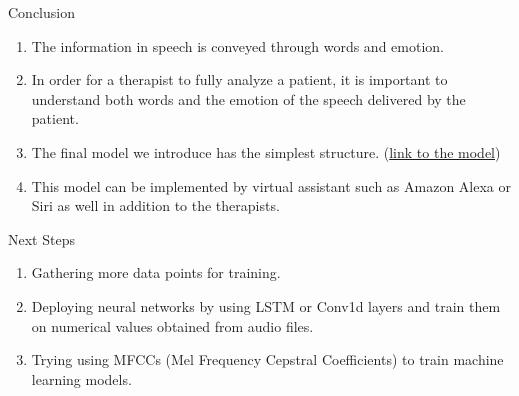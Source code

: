 \documentclass[xcolor={table}]{beamer}
\begin{document}
\begin{frame}{Conclusion}

\begin{enumerate}
    \item The information in speech is conveyed through words and emotion. 
    \item In order for a therapist to fully analyze a patient, it is important to understand both words and the emotion of the speech delivered by the patient. 
    \item The final model we introduce has the simplest structure. (\textcolor{blue}{\href{https://github.com/miladshiraniUCB/Emotion-Detection-in-Speech/blob/main/Notebook/Modeling-CNN-and-Transfer-Learning.ipynb}{link to the model}}) 
   \item This model can be implemented by virtual assistant such as Amazon Alexa or Siri as well in addition to the therapists.

\end{enumerate}



\end{frame}



\begin{frame}{Next Steps}
    
\begin{enumerate}
    \item Gathering more data points for training.
    \item Deploying neural networks by using LSTM or Conv1d layers and train them on numerical values obtained from audio files.
    \item Trying using MFCCs (Mel Frequency Cepstral Coefficients) to train machine learning models.
\end{enumerate}



\end{frame}


\end{document}
